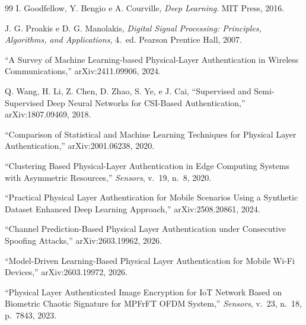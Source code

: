 \documentclass{sbrt}
\begin{document}
\begin{thebibliography}{99}
I. Goodfellow, Y. Bengio e A. Courville, \textit{Deep Learning}. MIT Press, 2016.

J. G. Proakis e D. G. Manolakis, \textit{Digital Signal Processing: Principles, Algorithms, and Applications}, 4.~ed. Pearson Prentice Hall, 2007.

``A Survey of Machine Learning-based Physical-Layer Authentication in Wireless Communications,'' arXiv:2411.09906, 2024.

Q. Wang, H. Li, Z. Chen, D. Zhao, S. Ye, e J. Cai, ``Supervised and Semi-Supervised Deep Neural Networks for CSI-Based Authentication,'' arXiv:1807.09469, 2018.

``Comparison of Statistical and Machine Learning Techniques for Physical Layer Authentication,'' arXiv:2001.06238, 2020.

``Clustering Based Physical-Layer Authentication in Edge Computing Systems with Asymmetric Resources,'' \textit{Sensors}, v.~19, n.~8, 2020.

``Practical Physical Layer Authentication for Mobile Scenarios Using a Synthetic Dataset Enhanced Deep Learning Approach,'' arXiv:2508.20861, 2024.

``Channel Prediction-Based Physical Layer Authentication under Consecutive Spoofing Attacks,'' arXiv:2603.19962, 2026.

``Model-Driven Learning-Based Physical Layer Authentication for Mobile Wi-Fi Devices,'' arXiv:2603.19972, 2026.

``Physical Layer Authenticated Image Encryption for IoT Network Based on Biometric Chaotic Signature for MPFrFT OFDM System,'' \textit{Sensors}, v.~23, n.~18, p.~7843, 2023.

\end{thebibliography}
\end{document}

